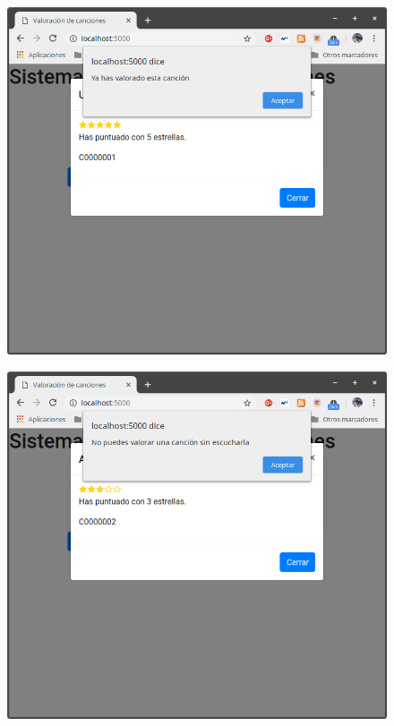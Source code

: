 \documentclass[12pt,a4paper]{article}
\begin{document}
\begin{figure}[H]
\centering
\includegraphics[scale=0.40]{implementaciones/implementacion_javier/imagenes/duplicada.png}
\end{figure}

\begin{figure}[H]
\centering
\includegraphics[scale=0.40]{implementaciones/implementacion_javier/imagenes/no_escuchada.png}
\end{figure}
\end{document}
